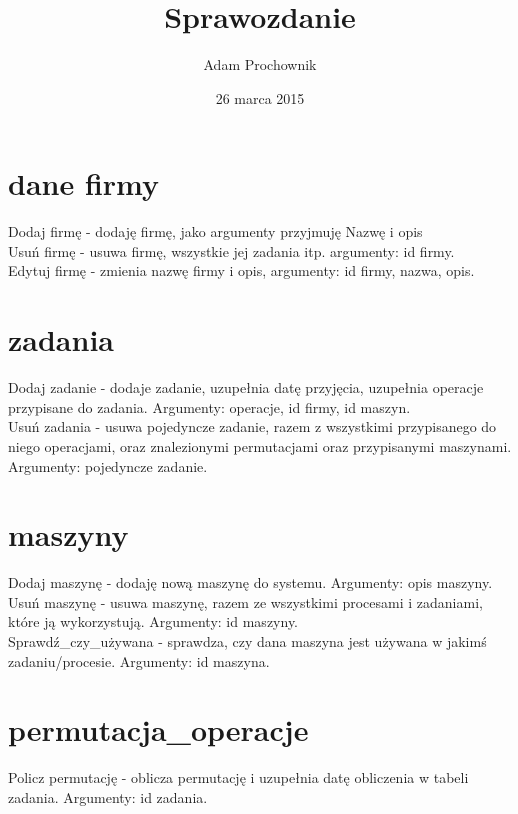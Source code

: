 \documentclass[2pt]{article}
\begin{document}
\title{Sprawozdanie}
\author{Adam Prochownik}

\date{26 marca 2015}

\section{dane firmy}
Dodaj firmę - dodaję firmę, jako argumenty przyjmuję Nazwę i opis \\

Usuń firmę - usuwa firmę, wszystkie jej zadania itp. argumenty: id firmy. \\

Edytuj firmę - zmienia nazwę firmy i opis, argumenty: id firmy,  nazwa, opis. \\

\section{zadania}
Dodaj zadanie - dodaje zadanie, uzupełnia datę przyjęcia, uzupełnia operacje przypisane do zadania. Argumenty: operacje, id firmy, id maszyn. \\

Usuń zadania - usuwa pojedyncze zadanie, razem z wszystkimi przypisanego do niego operacjami, oraz znalezionymi permutacjami oraz przypisanymi maszynami. Argumenty: pojedyncze zadanie. \\

\section{maszyny}
Dodaj maszynę - dodaję nową maszynę do systemu. Argumenty: opis maszyny. \\

Usuń maszynę - usuwa maszynę, razem ze wszystkimi procesami i zadaniami, które ją wykorzystują. Argumenty: id maszyny.\\

Sprawdź\_czy\_używana - sprawdza, czy dana maszyna jest używana w jakimś zadaniu/procesie. Argumenty: id maszyna. \\

\section{permutacja\_operacje}
Policz permutację - oblicza permutację i uzupełnia datę obliczenia w tabeli zadania. Argumenty: id zadania. \\
\end{document}
